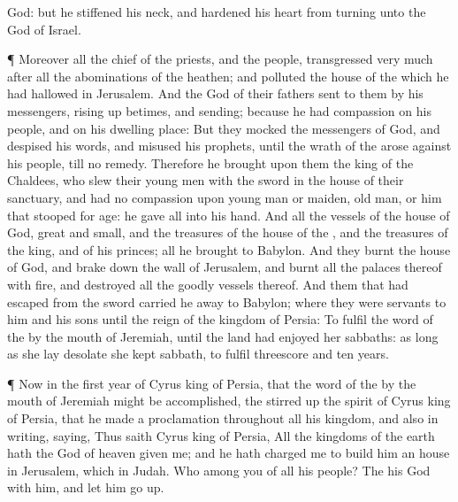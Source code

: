 {God: but he
stiffened his
neck, and
hardened his
heart from
turning unto the
{}
God of
Israel.
\par }{\PP {}¶ Moreover all the
chief of the
priests, and the
people,
transgressed
very
much after all the
abominations of the
heathen; and
polluted the
house of the
{} which he had
hallowed in
Jerusalem.
And the
{}
God of their
fathers
sent to them
by his
messengers, rising up
betimes, and
sending; because he had
compassion on his
people, and on his dwelling
place:
But they
mocked the
messengers of
God, and
despised his
words, and
misused his
prophets, until the
wrath of the
{}
arose against his
people, till
{} no
remedy.
Therefore he
brought upon them the
king of the
Chaldees, who
slew their young
men with the
sword in the
house of their
sanctuary, and had no
compassion upon young
man or
maiden, old
man, or him that stooped for
age: he
gave
{} all into his
hand.
And all the
vessels of the
house of
God,
great and
small, and the
treasures of the
house of the
{}, and the
treasures of the
king, and of his
princes; all
{} he
brought to
Babylon.
And they
burnt the
house of
God, and brake
down the
wall of
Jerusalem, and
burnt all the
palaces thereof with
fire, and
destroyed all the
goodly
vessels thereof.
And them that had
escaped from the
sword carried he
away to
Babylon; where they were
servants to him and his
sons until the
reign of the
kingdom of
Persia:
To
fulfil the
word of the
{} by the
mouth of
Jeremiah, until the
land had
enjoyed her
sabbaths:
{} as long
as she lay
desolate she kept
sabbath, to
fulfil threescore and
ten
years.
\par }{\PP {}¶ Now in the
first
year of
Cyrus
king of
Persia, that the
word of the
{}
{} by the
mouth of
Jeremiah might be
accomplished, the
{} stirred
up the
spirit of
Cyrus
king of
Persia, that he made a
proclamation throughout all his
kingdom, and
{} also in
writing,
saying,
Thus
saith
Cyrus
king of
Persia, All the
kingdoms of the
earth hath the
{}
God of
heaven
given me; and he hath
charged me to
build him an
house in
Jerusalem, which
{} in
Judah. Who
{} among you of all his
people? The
{} his
God
{} with him, and let him go
up.
\par }